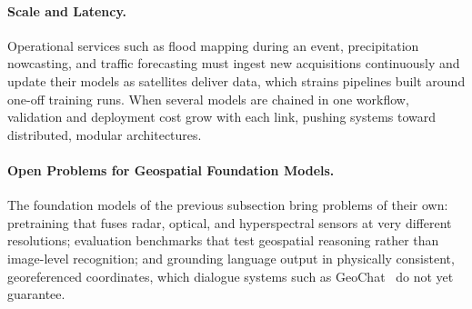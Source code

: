 \paragraph{Scale and Latency.} Operational services such as flood mapping during an event, precipitation nowcasting, and traffic forecasting must ingest new acquisitions continuously and update their models as satellites deliver data, which strains pipelines built around one-off training runs. When several models are chained in one workflow, validation and deployment cost grow with each link, pushing systems toward distributed, modular architectures.

\paragraph{Open Problems for Geospatial Foundation Models.} The foundation models of the previous subsection bring problems of their own: pretraining that fuses radar, optical, and hyperspectral sensors at very different resolutions; evaluation benchmarks that test geospatial reasoning rather than image-level recognition; and grounding language output in physically consistent, georeferenced coordinates, which dialogue systems such as GeoChat~\cite{kuckreja2024geochat} do not yet guarantee.
